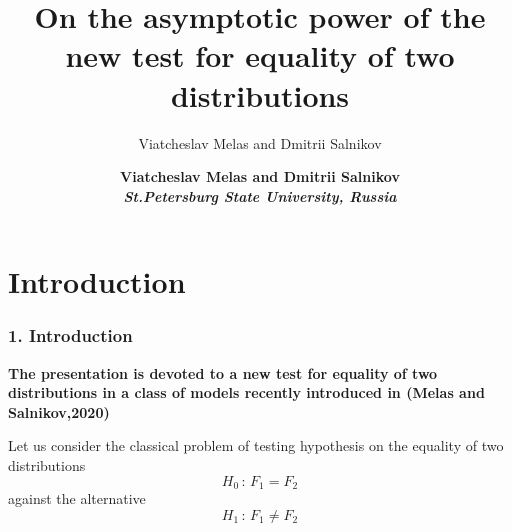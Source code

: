 \documentclass[slidestop,usepdftitle=false]{beamer}
\begin{document}
\title[New test for equality of two distributions]{On the asymptotic power of the new test for equality of two distributions}

\author{Viatcheslav Melas and Dmitrii Salnikov}

\begin{slide}


\author{\bf { Viatcheslav Melas and Dmitrii Salnikov}\\
{\it{St.Petersburg State University, Russia}}}
\date{}


\maketitle

\end{slide}

\begin{slide}

\tableofcontents \setcounter{section}{0}
\setcounter{subsection}{0}
\end{slide}
\section{Introduction} \label{sec1}

\begin{slide}
\frametitle{ 1. Introduction}
{\bf The presentation is devoted to a new test for equality of two distributions in a class of models recently introduced in (Melas and Salnikov,2020)

\bigskip


Let us consider the classical problem of testing hypothesis on the equality of two distributions
\begin{equation}
  \label{H0}
  H_0\,:\,F_1 = F_2
\end{equation}
against the alternative
\begin{equation}
  \label{H1}
  H_1\,:\,F_1 \not= F_2
\end{equation}}






\end{slide}
\end{document}
